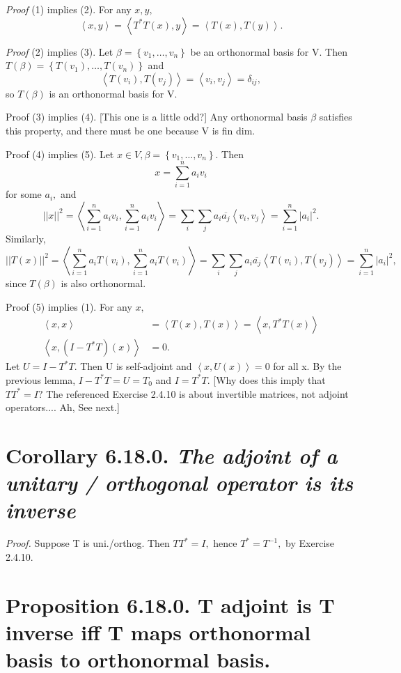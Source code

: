 \documentclass[12pt,english]{article}
\begin{document}
\emph{Proof} (1) implies (2). For any $x,y,$
\[
\left\langle x,y\right\rangle =\left\langle T^{*}T(x),y\right\rangle =\left\langle T(x),T(y)\right\rangle .
\]

\emph{Proof }(2) implies (3). Let $\beta=\left\{ v_{1},\ldots,v_{n}\right\} $
be an orthonormal basis for V. Then $T(\beta)=\left\{ T(v_{1}),\ldots,T(v_{n})\right\} $
and
\[
\left\langle T(v_{i}),T(v_{j})\right\rangle =\left\langle v_{i},v_{j}\right\rangle =\delta_{ij},
\]
so $T(\beta)$ is an orthonormal basis for V.

Proof (3) implies (4). {[}This one is a little odd?{]} Any orthonormal
basis $\beta$ satisfies this property, and there must be one because
V is fin dim.

Proof (4) implies (5). Let $x\in V,\beta=\left\{ v_{1},\ldots,v_{n}\right\} .$
Then
\[
x=\sum_{i=1}^{n}a_{i}v_{i}
\]
for some $a_{i},$ and
\[
\left|\left|x\right|\right|^{2}=\left\langle \sum_{i=1}^{n}a_{i}v_{i},\sum_{i=1}^{n}a_{i}v_{i}\right\rangle =\sum_{i}\sum_{j}a_{i}\overline{a_{j}}\left\langle v_{i},v_{j}\right\rangle =\sum_{i=1}^{n}\left|a_{i}\right|^{2}.
\]
Similarly,
\[
\left|\left|T(x)\right|\right|^{2}=\left\langle \sum_{i=1}^{n}a_{i}T(v_{i}),\sum_{i=1}^{n}a_{i}T(v_{i})\right\rangle =\sum_{i}\sum_{j}a_{i}\overline{a_{j}}\left\langle T(v_{i}),T(v_{j})\right\rangle =\sum_{i=1}^{n}\left|a_{i}\right|^{2},
\]
since $T(\beta)$ is also orthonormal.

Proof (5) implies (1). For any $x,$
\[
\begin{aligned}\left\langle x,x\right\rangle  & =\left\langle T(x),T(x)\right\rangle =\left\langle x,T^{*}T(x)\right\rangle \\
\left\langle x,(I-T^{*}T)(x)\right\rangle  & =0.
\end{aligned}
\]
Let $U=I-T^{*}T.$ Then U is self-adjoint and $\left\langle x,U(x)\right\rangle =0$
for all x. By the previous lemma, $I-T^{*}T=U=T_{0}$ and $I=T^{*}T.$
{[}Why does this imply that $TT^{*}=I?$ The referenced Exercise 2.4.10
is about invertible matrices, not adjoint operators.... Ah, See next.{]}

\section{Corollary 6.18.0. \emph{The adjoint of a unitary / orthogonal operator
is its inverse}}

\emph{Proof. }Suppose T is uni./orthog. Then $TT^{*}=I,$ hence $T^{*}=T^{-1},$
by Exercise 2.4.10.

\section{Proposition 6.18.0. T adjoint is T inverse iff T maps orthonormal
basis to orthonormal basis.}
\end{document}
